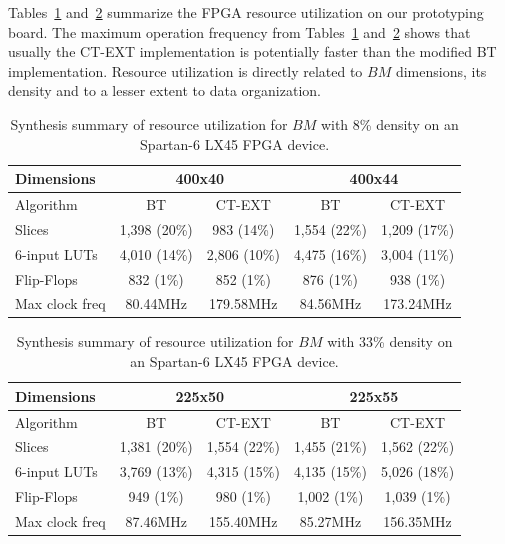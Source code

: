 \documentclass[authoryear,preprint,review,12pt]{elsarticle}
\begin{document}
Tables~\ref{table:6} and~\ref{table:7} summarize the FPGA resource utilization on our prototyping board. 
The maximum operation frequency from Tables~\ref{table:6} and~\ref{table:7} shows that usually the CT-EXT 
implementation is potentially faster than the modified BT implementation. Resource utilization is 
directly related to $BM$ dimensions, its density and to a lesser extent to data organization.

\begin{table}[htb]
\caption{Synthesis summary of resource utilization for $BM$ with 8\% density on an Spartan-6 LX45 
FPGA device.} \label{table:6}
\begin{center}
    \begin{tabular}{lcccc}   \hline
    	    Dimensions & \multicolumn{2}{c}{400x40} & \multicolumn{2}{c}{400x44} \\ \hline
    	    Algorithm & BT & CT-EXT & BT & CT-EXT \\ \hline
        Slices & 1,398 (20\%) & 983 (14\%) & 1,554 (22\%) & 1,209 (17\%)  \\
        6-input LUTs & 4,010 (14\%) & 2,806 (10\%)& 4,475 (16\%)  & 3,004 (11\%)\\
        Flip-Flops & 832 (1\%) & 852 (1\%) & 876 (1\%) & 938 (1\%)\\
        Max clock freq & 80.44MHz & 179.58MHz & 84.56MHz & 173.24MHz\\ \hline
    \end{tabular}
\end{center}
\end{table}

\begin{table}[htb]
\caption{Synthesis summary of resource utilization for $BM$ with 33\% density on an Spartan-6 LX45 
FPGA device.} \label{table:7}
\begin{center}
    \begin{tabular}{lcccc}   \hline
    	    Dimensions & \multicolumn{2}{c}{225x50} & \multicolumn{2}{c}{225x55} \\ \hline
    	    Algorithm & BT & CT-EXT & BT & CT-EXT \\ \hline 
        Slices & 1,381 (20\%) & 1,554 (22\%) & 1,455 (21\%) & 1,562 (22\%) \\
        6-input LUTs & 3,769 (13\%) & 4,315 (15\%) & 4,135 (15\%) & 5,026 (18\%)\\
        Flip-Flops & 949 (1\%) & 980 (1\%) & 1,002 (1\%) & 1,039 (1\%)\\
        Max clock freq & 87.46MHz & 155.40MHz & 85.27MHz & 156.35MHz\\ \hline
    \end{tabular}
\end{center}
\end{table}
\end{document}
